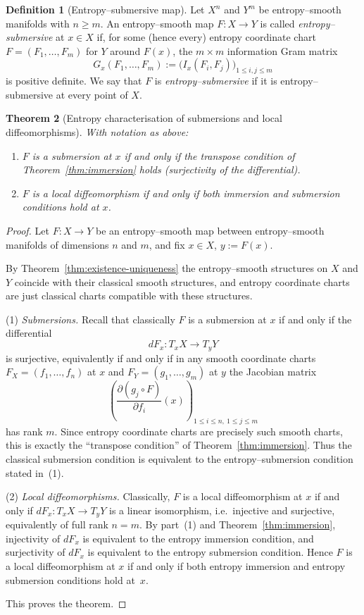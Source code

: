\documentclass[11pt]{amsart}
\newtheorem{theorem}{Theorem}[section]
\theoremstyle{definition}
\newtheorem{definition}[theorem]{Definition}
\theoremstyle{remark}
\begin{document}
\begin{definition}[Entropy--submersive map]
Let $X^n$ and $Y^m$ be entropy--smooth manifolds with $n\ge m$.
An entropy--smooth map $F:X\to Y$ is called \emph{entropy--submersive} at 
$x\in X$ if, for some (hence every) entropy coordinate chart 
$F=(F_1,\dots,F_m)$ for $Y$ around $F(x)$, the $m\times m$ information 
Gram matrix
\[
G_x(F_1,\dots,F_m)
:=
\bigl(I_x(F_i,F_j)\bigr)_{1\le i,j\le m}
\]
is positive definite.
We say that $F$ is \emph{entropy--submersive} if it is entropy--submersive
at every point of $X$.
\end{definition}


\begin{theorem}[Entropy characterisation of submersions and local diffeomorphisms]
\label{thm:submersion}
With notation as above:
\begin{enumerate}
\item $F$ is a submersion at $x$ if and only if the transpose condition of 
Theorem~\ref{thm:immersion} holds (surjectivity of the differential).
\item $F$ is a local diffeomorphism if and only if both immersion and submersion
conditions hold at $x$.
\end{enumerate}
\end{theorem}
\begin{proof}
Let $F:X\to Y$ be an entropy–smooth map between entropy–smooth manifolds of
dimensions $n$ and $m$, and fix $x\in X$, $y:=F(x)$.

By Theorem~\ref{thm:existence-uniqueness} the entropy–smooth structures on $X$ and $Y$ coincide with their
classical smooth structures, and entropy coordinate charts are just classical
charts compatible with these structures.

\smallskip\noindent
(1) \emph{Submersions.}
Recall that classically $F$ is a submersion at $x$ if and only if the differential
\[
dF_x:T_xX\longrightarrow T_yY
\]
is surjective, equivalently if and only if in any smooth coordinate charts
$F_X=(f_1,\dots,f_n)$ at $x$ and $F_Y=(g_1,\dots,g_m)$ at $y$ the Jacobian
matrix
\[
\left(\frac{\partial(g_j\circ F)}{\partial f_i}(x)\right)_{1\le i\le n,\ 1\le j\le m}
\]
has rank $m$. Since entropy coordinate charts are precisely such smooth charts,
this is exactly the ``transpose condition'' of Theorem~\ref{thm:immersion}. Thus the classical
submersion condition is equivalent to the entropy–submersion condition stated
in~(1).

\smallskip\noindent
(2) \emph{Local diffeomorphisms.}
Classically, $F$ is a local diffeomorphism at $x$ if and only if
$dF_x:T_xX\to T_yY$ is a linear isomorphism, i.e.\ injective and surjective,
equivalently of full rank $n=m$. By part~(1) and Theorem~\ref{thm:immersion}, injectivity of
$dF_x$ is equivalent to the entropy immersion condition, and surjectivity of
$dF_x$ is equivalent to the entropy submersion condition. Hence $F$ is a local
diffeomorphism at $x$ if and only if both entropy immersion and entropy
submersion conditions hold at~$x$.

This proves the theorem.
\end{proof}
\end{document}
